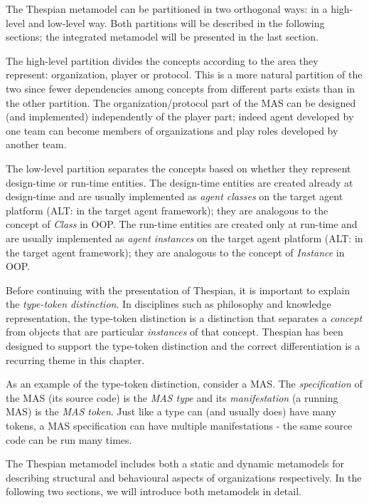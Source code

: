 The Thespian metamodel can be partitioned in two orthogonal ways: in a high-level and low-level way.
Both partitions will be described in the following sections; the integrated metamodel will be presented in the last section.

The high-level partition divides the concepts according to the area they represent: organization, player or protocol.
This is a more natural partition of the two since fewer dependencies among concepts from different parts exists than in the other partition.
The organization/protocol part of the MAS can be designed (and implemented) independently of the player part; indeed agent developed by one team can become members of organizations and play roles developed by another team. 

The low-level partition separates the concepts based on whether they represent design-time or run-time entities.
The design-time entities are created already at design-time and are usually implemented as \textit{agent classes} on the target agent platform (ALT: in the target agent framework); they are analogous to the concept of \textit{Class} in OOP.
The run-time entities are created only at run-time and are usually implemented as \textit{agent instances} on the target agent platform (ALT: in the target agent framework); they are analogous to the concept of \textit{Instance} in OOP.

Before continuing with the presentation of Thespian, it is important to explain the \textit{type-token distinction}.
In disciplines such as philosophy and knowledge representation, the type-token distinction is a distinction that separates a \textit{concept} from objects that are particular \textit{instances} of that concept.
Thespian has been designed to support the type-token distinction and the correct differentiation is a recurring theme in this chapter.

As an example of the type-token distinction, consider a MAS.
The \textit{specification} of the MAS (its source code) is the \textit{MAS type} and its \textit{manifestation} (a running MAS) is the \textit{MAS token}.
Just like a type can (and usually does) have many tokens, a MAS specification can have multiple manifestations - the same source code can be run many times.

The Thespian metamodel includes both a static and dynamic metamodels for describing structural and behavioural aspects of organizations respectively.
In the following two sections, we will introduce both metamodels in detail.



